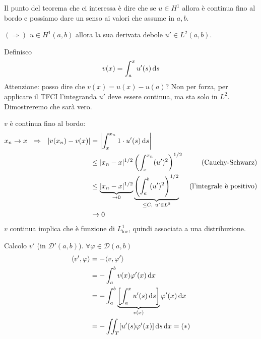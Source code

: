 Il punto del teorema che ci interessa è dire che se $u\in H^{1}$ allora è continua fino al bordo e possiamo dare un senso ai valori che assume in $a,b$.
\begin{dimostrazione}
    $(\Rightarrow)$ $u\in H^{1}(a,b)$ allora la sua derivata debole $u'\in L^{2}(a,b)$.

    Definisco
    \begin{equation*}
        v(x) =\int ^{x}_{a} u'(s) \,\mathrm d s
    \end{equation*}
    Attenzione: posso dire che $v(x) =u(x) -u(a)$? Non per forza, per applicare il TFCI l'integranda $u'$ deve essere continua, ma sta solo in $L^{2}$. Dimostreremo che sarà vero.

    $v$ è continua fino al bordo:
    \begin{align*}
        x_{n}\rightarrow x\ \ \Rightarrow \ \ | v(x_{n}) -v(x)| & =\left| \int ^{x_{n}}_{x} 1\cdot u'(s) \ds\right|                                                                                          &                                 \\
                                                                & \leqslant | x_{n} -x| ^{1/2}\left(\int ^{x_{n}}_{x}(u')^{2}\right)^{1/2}                                                                   & \text{(Cauchy-Schwarz)}         \\
                                                                & \leqslant \underbrace{| x_{n} -x| ^{1/2}}_{\rightarrow 0}\underbrace{\left(\int ^{b}_{a}(u')^{2}\right)^{1/2}}_{\leqslant C,\ u'\in L^{2}} & \text{(l'integrale è positivo)} \\
                                                                & \rightarrow 0                                                                                                                              &
    \end{align*}
    $v$ continua implica che è funzione di $L^{1}_{\mathrm{loc}}$, quindi associata a una distribuzione.

    Calcolo $v'$ (in $\mathcal{D} '(a,b)$). $\forall \varphi \in \mathcal{D}(a,b)$
    \begin{align*}
        \langle v',\varphi \rangle & =-\langle v,\varphi '\rangle                                                             \\
                                   & =-\int ^{b}_{a} v(x) \varphi '(x) \,\mathrm d x                                                    \\
                                   & =-\int ^{b}_{a}\underbrace{\left[\int ^{x}_{a} u'(s) \,\mathrm d s\right]}_{v(x)} \varphi '(x) \,\mathrm d x \\
                                   & =-\iint _{T}[ u'(s) \varphi '(x)] \,\mathrm d s\,\mathrm d x=(*)
    \end{align*}


\end{dimostrazione}
